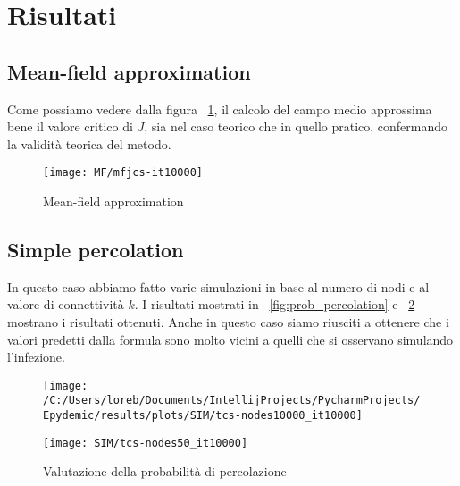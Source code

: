 \section{Risultati}\label{sec:risultati}

\subsection{Mean-field approximation}\label{subsec:res-mean-field-approximation}
    Come possiamo vedere dalla figura ~\ref{fig:mf_critical_j}, il calcolo del campo medio approssima bene il valore
    critico di $J$, sia nel caso teorico che in quello pratico, confermando la validità teorica del metodo.

    \begin{figure}[H]
        \texttt{[image: MF/mfjcs-it10000]}\caption{Mean-field approximation}
        \label{fig:mf_critical_j}
    \end{figure}

\subsection{Simple percolation}\label{subsec:res-simple-percolation}
    In questo caso abbiamo fatto varie simulazioni in base al numero di nodi e al valore di connettività $k$.
    I risultati mostrati in ~\ref{fig:prob_percolation} e ~\ref{fig:prob_percolation_2} mostrano i risultati ottenuti.
    Anche in questo caso siamo riusciti a ottenere che i valori predetti dalla formula sono molto vicini a
    quelli che si osservano simulando l'infezione.

    \begin{figure}[H]
        \begin{minipage}{0.5\textwidth}
            \texttt{[image: /C:/Users/loreb/Documents/IntellijProjects/PycharmProjects/Epydemic/results/plots/SIM/tcs-nodes10000\_it10000]}\label{fig:prob_percolation}
        \end{minipage}
        \begin{minipage}{0.5\textwidth}
            \texttt{[image: SIM/tcs-nodes50\_it10000]}\label{fig:prob_percolation_2}
        \end{minipage}
        \caption{Valutazione della probabilità di percolazione}
    \end{figure}


